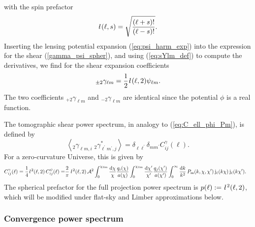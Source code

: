 \documentclass[fleqn,usenatbib]{mnras} %
\newcommand{\ellbar}{\hbox{\it \l}\,}
\newcommand{\pref}{{\cal A}}
\begin{document}
%
with the spin prefactor \citep{2012PhRvD..86b3001B}
%
\begin{equation}
  \ellbar(\ell, s) = \sqrt{\frac{(\ell + s)!}{(\ell - s)!}}.
  \label{eq:ellbar}
\end{equation} 
%
Inserting the lensing potential expansion (\ref{eq:psi_harm_exp}) into the
expression for the shear (\ref{gamma_psi_spher}), and using (\ref{eq:sYlm_def})
to compute the derivatives, we find for the shear expansion coefficients
\citep{2000PhRvD..62d3007H,2001astro.ph.11605T}
%
%
\begin{equation}
  _{\pm 2} \gamma_{\ell m} = \frac 1 2 \ellbar(\ell, 2) \psi_{\ell m}.
  \label{eq:gamma_ellm_phi_ellm}
\end{equation}
%
The two coefficients $_{+2} \gamma_{\ell m}$ and $_{-2} \gamma_{\ell m}$ are
identical since the potential $\phi$ is a real function.

The tomographic shear power spectrum, in analogy to (\ref{eq:C_ell_phi_Pm}), is defined by
%
\begin{equation}
  \left\langle _2\gamma^{}_{\ell m, i} \; {}_2\gamma^\ast_{\ell^\prime m^\prime, j} \right\rangle
    = \delta_{\ell \ell^\prime} \delta_{m m^\prime} C^\gamma_{ij}(\ell).
  \label{eq:C_ell_gamma}
\end{equation}
%
For a zero-curvature Universe, this is given by
%
\begin{align}
  C^\gamma_{ij}(\ell) = \frac 1 4 \ellbar^2(\ell, 2) \, C^\psi_{ij}(\ell)
                 = & \frac 2 \pi \, \ellbar^2(\ell, 2) \, \pref^2
                 \int_{0}^{\chi_{\rm lim}} \frac{\rm d \chi}{\chi} \frac{q_i(\chi)}{a(\chi)}
                \int_{0}^{\chi_{\rm lim}} \frac{\rm d \chi^\prime}{\chi^\prime}
                \frac{q_j(\chi^\prime)}{a(\chi^\prime)}
                \int_0^\infty \frac{{\rm d} k}{k^2} \, P_{\rm m}(k, \chi, \chi^\prime) \,
                {\rm j}_\ell(k \chi) \, {\rm j}_\ell(k \chi^\prime) .
  \label{eq:C_ell_full}
\end{align}
%
The spherical prefactor for the full projection power spectrum is $p(\ell) :=
\ellbar^2(\ell, 2)$, which will be modified under flat-sky and Limber
approximations below.

\subsubsection{Convergence power spectrum}
\end{document}
